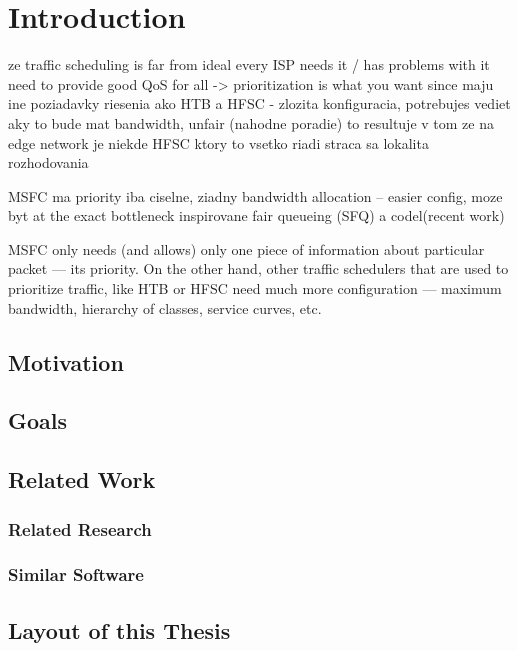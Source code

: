 \chapter*{Introduction}



ze traffic scheduling is far from ideal
every ISP needs it / has problems with it
need to provide good QoS for all -> prioritization is what you want since maju ine poziadavky
riesenia ako HTB a HFSC - zlozita konfiguracia, potrebujes vediet aky to bude mat bandwidth, unfair (nahodne poradie)
to resultuje v tom ze na edge network je niekde HFSC ktory to vsetko riadi
straca sa lokalita rozhodovania

MSFC ma priority iba ciselne, ziadny bandwidth allocation -- easier config, moze byt at the exact bottleneck
inspirovane fair queueing (SFQ) a codel(recent work)


 MSFC only needs (and allows) only one piece of information about particular packet --- its priority. On the other hand, other traffic schedulers that are used to prioritize traffic, like HTB or HFSC need much more configuration --- maximum bandwidth, hierarchy of classes, service curves, etc. 

\section*{Motivation}

\clearpage
\section*{Goals}


\section*{Related Work}

\subsection*{Related Research}


\subsection*{Similar Software}


\section*{Layout of this Thesis}

